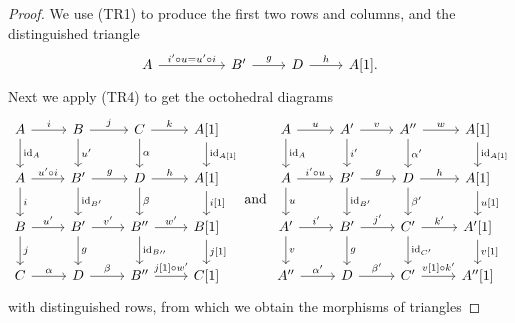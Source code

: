 \documentclass[dissertation.tex]{subfiles}
\begin{document}
\begin{prop}
  \begin{proof}
    We use (TR1) to produce the first two rows and columns, and the distinguished triangle 
    $$\begin{tikzcd}
      A \arrow{rr}{i^\prime \circ u = u^\prime \circ i} & & B^\prime \arrow{r}{g} & D \arrow{r}{h} & A[1].
    \end{tikzcd}$$
    Next we apply (TR4) to get the octohedral diagrams 
    $$\begin{tikzcd}
      A \arrow{r}{i}\arrow{d}{\id_A} & B\arrow{r}{j}\arrow{d}{u^\prime} & C\arrow{r}{k}\arrow{d}{\alpha} & A[1]\arrow{d}{\id_{A[1]}}\\
      A \arrow{r}{u^\prime \circ i}\arrow{d}{i} & B^\prime \arrow{r}{g}\arrow{d}{\id_{B^\prime}} & D \arrow{r}{h}\arrow{d}{\beta} & A[1]\arrow{d}{i[1]}\\
      B \arrow{r}{u^\prime}\arrow{d}{j} & B^\prime \arrow{r}{v^\prime}\arrow{d}{g} & B^{\prime\prime} \arrow{r}{w^\prime}\arrow{d}{\id_{B{\prime\prime}}} & B[1]\arrow{d}{j[1]}\\
      C \arrow{r}{\alpha} & D \arrow{r}{\beta} & B^{\prime\prime}\arrow{r}{j[1] \circ w^\prime} & C[1]
    \end{tikzcd}
    \ \text{and}\ 
    \begin{tikzcd}
      A \arrow{r}{u}\arrow{d}{\id_A} & A^\prime \arrow{r}{v}\arrow{d}{i^\prime} & A^{\prime\prime}\arrow{r}{w}\arrow{d}{\alpha^\prime} & A[1]\arrow{d}{\id_{A[1]}}\\
      A\arrow{r}{i^\prime \circ u}\arrow{d}{u} & B^\prime \arrow{r}{g}\arrow{d}{\id_{B^\prime}} & D \arrow{r}{h}\arrow{d}{\beta^\prime} & A[1]\arrow{d}{u[1]}\\
      A^\prime \arrow{r}{i^\prime}\arrow{d}{v} & B^\prime \arrow{r}{j^\prime}\arrow{d}{g} & C^\prime \arrow{r}{k^\prime}\arrow{d}{\id_{C^\prime}} & A^\prime[1]\arrow{d}{v[1]}\\
      A^{\prime\prime} \arrow{r}{\alpha^\prime} & D \arrow{r}{\beta^\prime} & C^\prime \arrow{r}{v[1] \circ k^\prime} & A^{\prime\prime}[1]
    \end{tikzcd}$$
    with distinguished rows, from which we obtain the morphisms of triangles

\end{proof}
\end{prop}
\end{document}

